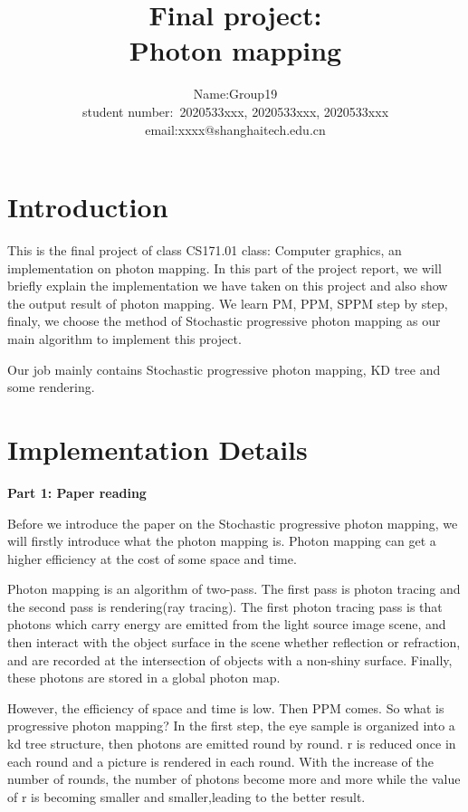 \documentclass[acmtog]{acmart}
\title{Final project:\\ {Photon mapping}}
\author{Name:\quad Group19  \\ student number:\ 2020533xxx, 2020533xxx, 2020533xxx
\\email:\quad xxxx@shanghaitech.edu.cn}
\begin{document}
\maketitle

\vspace*{2 ex}

\section{Introduction} 

\quad This is the final project of class CS171.01 class: Computer graphics, an implementation on photon mapping. 
In this part of the project report, we will briefly explain the implementation we have taken on this project
and also show the output result of photon mapping. We learn PM, PPM, SPPM step by step, finaly, we choose the method of Stochastic progressive photon mapping
as our main algorithm to implement this project.

Our job mainly contains Stochastic progressive photon mapping, KD tree and some rendering. 

\section{Implementation Details}

\quad \textbf{Part 1: Paper reading}

Before we introduce the paper on the Stochastic progressive photon mapping, we will firstly introduce what the photon mapping is. Photon mapping can get a higher efficiency at the cost of some space and time.

Photon mapping is an algorithm of two-pass. The first pass is photon tracing and the second pass is rendering(ray tracing). The first photon tracing pass is that photons which carry energy are emitted from the light source image scene, and then interact with the object surface in the scene whether reflection or refraction, and are recorded at the intersection of objects with a non-shiny surface. Finally, these photons are stored in a global photon map.

However, the efficiency of space and time is low. Then PPM comes. So what is progressive photon mapping? In the first step, the eye sample is organized into a kd tree structure, then photons are emitted round by round. r is reduced once in each round and a picture is rendered in each round. With the increase of the number of rounds, the number of photons become more and more while the value of r is becoming smaller and smaller,leading to the better result.
\end{document}
